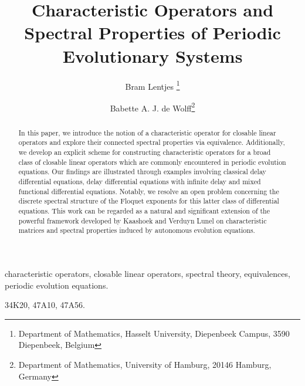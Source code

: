 \documentclass[english]{myarticle}
\title{Characteristic Operators and Spectral Properties of Periodic Evolutionary Systems}
\author{Bram Lentjes \thanks{Department of Mathematics, Hasselt University, Diepenbeek Campus, 3590 Diepenbeek, Belgium \email{(bram.lentjes@uhasselt.be)}}
\and Babette A. J. de Wolff\thanks{Department of Mathematics, University of Hamburg, 20146 Hamburg, Germany \email{(babette.de.wolff@uni-hamburg.de)}}}
\begin{document}
\maketitle
\begin{abstract}
In this paper, we introduce the notion of a characteristic operator for closable linear operators and explore their connected spectral properties via equivalence. Additionally, we develop an explicit scheme for constructing characteristic operators for a broad class of closable linear operators which are commonly encountered in periodic evolution equations. Our findings are illustrated through examples involving classical delay differential equations, delay differential equations with infinite delay and mixed functional differential equations. Notably, we resolve an open problem concerning the discrete spectral structure of the Floquet exponents for this latter class of differential equations. This work can be regarded as a natural and significant extension of the powerful framework developed by Kaashoek and Verduyn Lunel \cite{Kaashoek1992} on characteristic matrices and spectral properties induced by autonomous evolution equations.
\end{abstract}

\begin{keywords}
characteristic operators, closable linear operators, spectral theory, equivalences, periodic evolution equations.
\end{keywords}

\begin{MSCcodes}
34K20, 47A10, 47A56.
\end{MSCcodes}
\end{document}
